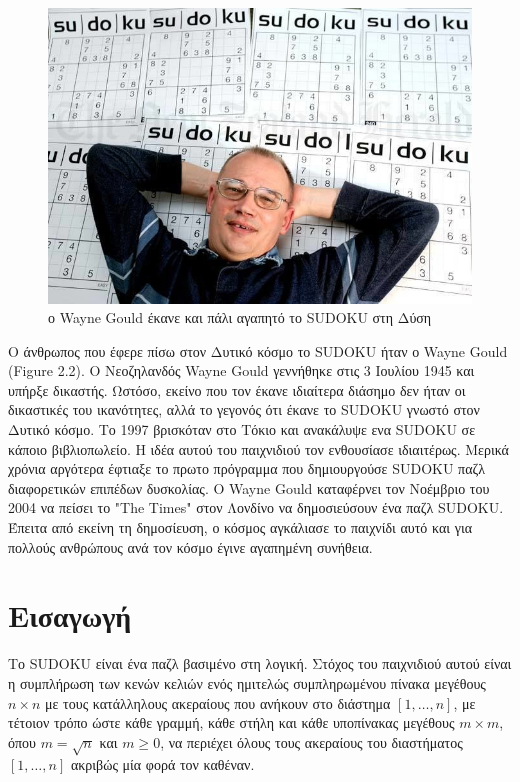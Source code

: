 \documentclass[12pt]{book}
\theoremstyle{definition}
\begin{document}
\begin{figure}[h]
	\centering	
	\includegraphics[scale=0.45]{Figures/WayneGould.jpg}
	\caption{ο Wayne Gould έκανε και πάλι αγαπητό το SUDOKU στη Δύση}
\end{figure}

Ο άνθρωπος που έφερε πίσω στον Δυτικό κόσμο το SUDOKU ήταν ο Wayne Gould (Figure 2.2). Ο Νεοζηλανδός Wayne Gould γεννήθηκε στις 3 Ιουλίου 1945 και υπήρξε δικαστής. Ωστόσο, εκείνο που τον έκανε ιδιαίτερα διάσημο δεν ήταν οι δικαστικές του ικανότητες, αλλά το γεγονός ότι έκανε το SUDOKU γνωστό στον Δυτικό κόσμο. Το 1997 βρισκόταν στο Τόκιο και ανακάλυψε ενα SUDOKU σε κάποιο βιβλιοπωλείο. Η ιδέα αυτού του παιχνιδιού τον ενθουσίασε ιδιαιτέρως. Μερικά χρόνια αργότερα έφτιαξε το πρωτο πρόγραμμα που δημιουργούσε SUDOKU παζλ διαφορετικών επιπέδων δυσκολίας. Ο Wayne Gould καταφέρνει τον Νοέμβριο του 2004 να πείσει το "The Times" στον Λονδίνο να δημοσιεύσουν ένα παζλ SUDOKU. Έπειτα από εκείνη τη δημοσίευση, ο κόσμος αγκάλιασε το παιχνίδι αυτό και για πολλούς ανθρώπους ανά τον κόσμο έγινε αγαπημένη συνήθεια.

\chapter{Εισαγωγή}

Το SUDOKU είναι ένα παζλ βασιμένο στη λογική. Στόχος του παιχνιδιού αυτού είναι η συμπλήρωση των
κενών κελιών ενός ημιτελώς συμπληρωμένου πίνακα μεγέθους
\(n \times n\) με τους κατάλληλους ακεραίους που ανήκουν στο διάστημα \(\left[1,\dots,n \right]\), με τέτοιον τρόπο ώστε κάθε γραμμή, κάθε στήλη και κάθε υποπίνακας μεγέθους \(m \times m\), όπου \(m = \sqrt{n} \) και \( m \ge 0\), να περιέχει όλους τους ακεραίους του διαστήματος  \(\left[1,\dots,n \right]\) ακριβώς μία φορά τον καθέναν. \par
\end{document}
